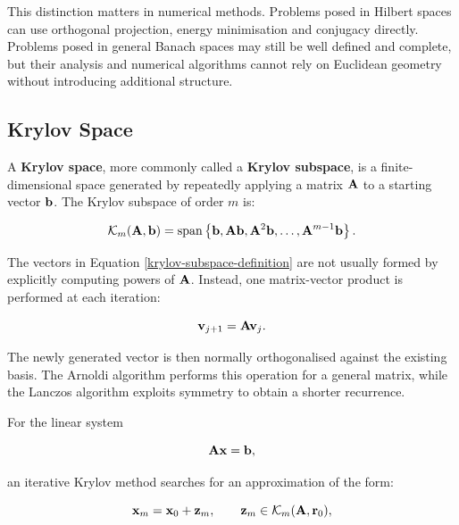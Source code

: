 This distinction matters in numerical methods. Problems posed in Hilbert spaces
can use orthogonal projection, energy minimisation and conjugacy directly.
Problems posed in general Banach spaces may still be well defined and complete,
but their analysis and numerical algorithms cannot rely on Euclidean geometry
without introducing additional structure.

\subsection{Krylov Space}

A \textbf{Krylov space}, more commonly called a \textbf{Krylov subspace}, is a
finite-dimensional space generated by repeatedly applying a matrix $ \mathbf{A} $ to
a starting vector $ \mathbf{b} $. The Krylov subspace of order $ m $ is:

\begin{bbox}
    \begin{equation}\label{krylov-subspace-definition}
        \mathcal{K}_m(\mathbf{A},\mathbf{b}) =
        \operatorname{span}
        \left\{
            \mathbf{b},\mathbf{A}\mathbf{b},\mathbf{A}^2\mathbf{b},\dots,
            \mathbf{A}^{m-1}\mathbf{b}
        \right\}.
    \end{equation}
\end{bbox}

The vectors in Equation \eqref{krylov-subspace-definition} are not usually formed
by explicitly computing powers of $ \mathbf{A} $. Instead, one matrix-vector product
is performed at each iteration:

\begin{equation}
    \mathbf{v}_{j+1} = \mathbf{A}\mathbf{v}_j.
\end{equation}

The newly generated vector is then normally orthogonalised against the existing
basis. The Arnoldi algorithm performs this operation for a general matrix, while
the Lanczos algorithm exploits symmetry to obtain a shorter recurrence.

For the linear system

\begin{equation}
    \mathbf{A}\mathbf{x}=\mathbf{b},
\end{equation}

an iterative Krylov method searches for an approximation of the form:

\begin{equation}
    \mathbf{x}_m = \mathbf{x}_0 + \mathbf{z}_m,
    \qquad
    \mathbf{z}_m \in \mathcal{K}_m(\mathbf{A},\mathbf{r}_0),
\end{equation}

